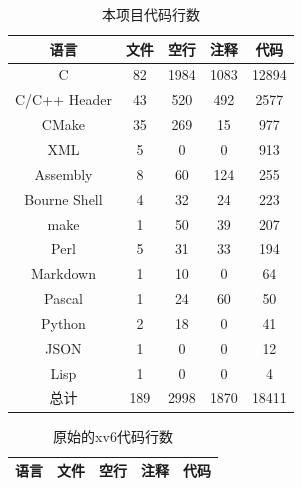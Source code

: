 \documentclass[a4paper,twoside]{ctexrep}
\begin{document}
\begin{spacing}{1.2}
\begin{table}[H]
	\centering
	\caption{本项目代码行数}
	\label{tab:xv6enhanced}
	\begin{tabular}{c|c|c|c|c}
		\toprule
		\hline
		\textbf{语言} & \textbf{文件} & \textbf{空行} & \textbf{注释} & \textbf{代码} \\
		\hline
		C                            &   82        &   1984     &      1083       &   12894\\
		C/C++ Header                 &   43        &    520     &       492       &    2577\\
		CMake                        &   35        &    269     &        15       &     977\\
		XML                          &    5        &      0     &         0       &     913\\
		Assembly                     &    8        &     60     &       124       &     255\\
		Bourne Shell                 &    4        &     32     &        24       &     223\\
		make                         &    1        &     50     &        39       &     207\\
		Perl                         &    5        &     31     &        33       &     194\\
		Markdown                     &    1        &     10     &         0       &      64\\
		Pascal                       &    1        &     24     &        60       &      50\\
		Python                       &    2        &     18     &         0       &      41\\
		JSON                         &    1        &      0     &         0       &      12\\
		Lisp                         &    1        &      0     &         0       &       4\\
		\hline
		总计                          & 189         &  2998      &     1870        &  18411 \\
		\hline
		\bottomrule
	\end{tabular}
\end{table}
\begin{table}[H]
	\centering
	\caption{原始的xv6代码行数}
	\label{tab:xv6}
	\begin{tabular}{c|c|c|c|c}
		\toprule
		\hline
		\textbf{语言} & \textbf{文件} & \textbf{空行} & \textbf{注释} & \textbf{代码} \\
		\hline

\end{tabular}
\end{table}
\end{spacing}
\end{document}
